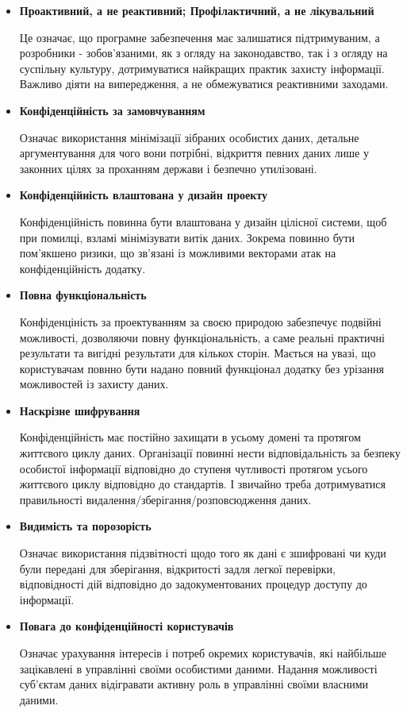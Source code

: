 \begin{itemize}

    \item \textbf{Проактивний, а не реактивний; Профілактичний, а не лікувальний}
    
    Це означає, що програмне забезпечення має залишатися підтримуваним, а розробники - зобов’язаними, як з огляду на законодавство, так і з огляду на суспільну культуру, дотримуватися найкращих практик захисту інформації. Важливо діяти на випередження, а не обмежуватися реактивними заходами.
    
    \item \textbf{Конфіденційність за замовчуванням}

    Означає використання мінімізації зібраних особистих даних, детальне аргументування для чого вони потрібні, відкриття певних даних лише у законних цілях за проханням держави і безпечно утилізовані.
    
    \item \textbf{Конфіденційність влаштована у дизайн проекту}

    Конфіденційність повинна бути влаштована у дизайн цілісної системи, щоб при помилці, взламі мінімізувати витік даних. Зокрема повинно бути пом'якшено ризики, що зв'язані із можливими векторами атак на конфіденційність додатку.
    
    \item \textbf{Повна функціональність}

    Конфіденціність за проектуванням за своєю природою забезпечує подвійні можливості, дозволяючи повну функціональність, а саме реальні практичні результати та вигідні результати для кількох сторін. Мається на увазі, що користувачам повнно бути надано повний функціонал додатку без урізання можливостей із захисту даних.
    
    \item \textbf{Наскрізне шифрування}

    Конфіденційність має постійно захищати в усьому домені та протягом життєвого циклу даних. Організації повинні нести відповідальність за безпеку особистої інформації відповідно до ступеня чутливості протягом усього життєвого циклу відповідно до стандартів. І звичайно треба дотримуватися правильності видалення/зберігання/розповсюдження даних.
    
    \item \textbf{Видимість та порозорість}

    Означає використання підзвітності щодо того як дані є зшифровані чи куди були передані для зберігання, відкритості задля легкої перевірки, відповідності дій відповідно до задокументованих процедур доступу до інформації.
    
    \item \textbf{Повага до конфіденційності користувачів}

    Означає урахування інтересів і потреб окремих користувачів, які найбільше зацікавлені в управлінні своїми особистими даними. Надання можливості суб’єктам даних відігравати активну роль в управлінні своїми власними даними.
    
\end{itemize}